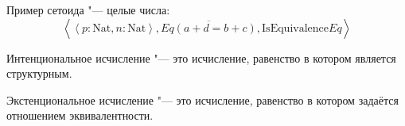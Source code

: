 Пример сетоида "--- целые числа:
\[
    \left< \left<p : \mathrm{Nat}, n : \mathrm{Nat}\right>, \overline{Eq(a+d=b+c)}, \mathrm{IsEquivalence} Eq\right>
\]

Интенциональное исчисление "--- это исчисление, равенство в котором является структурным.

Экстенциональное исчисление "--- это исчисление, равенство в котором задаётся отношением эквивалентности.
